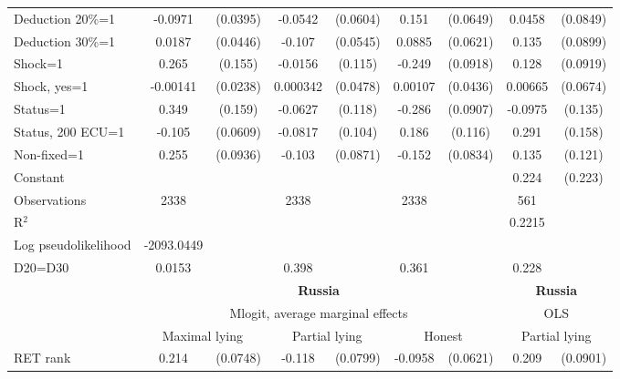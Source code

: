 \begin{tabular}{l|cccccc|cc}
Deduction 20\%=1&  -0.0971\sym{**} & (0.0395)&  -0.0542         & (0.0604)&    0.151\sym{**} & (0.0649)&   0.0458         & (0.0849)\\
Deduction 30\%=1&   0.0187         & (0.0446)&   -0.107\sym{**} & (0.0545)&   0.0885         & (0.0621)&    0.135         & (0.0899)\\
Shock=1         &    0.265\sym{*}  &  (0.155)&  -0.0156         &  (0.115)&   -0.249\sym{***}& (0.0918)&    0.128         & (0.0919)\\
Shock, yes=1    & -0.00141         & (0.0238)& 0.000342         & (0.0478)&  0.00107         & (0.0436)&  0.00665         & (0.0674)\\
Status=1        &    0.349\sym{**} &  (0.159)&  -0.0627         &  (0.118)&   -0.286\sym{***}& (0.0907)&  -0.0975         &  (0.135)\\
Status, 200 ECU=1&   -0.105\sym{*}  & (0.0609)&  -0.0817         &  (0.104)&    0.186         &  (0.116)&    0.291\sym{*}  &  (0.158)\\
Non-fixed=1     &    0.255\sym{***}& (0.0936)&   -0.103         & (0.0871)&   -0.152\sym{*}  & (0.0834)&    0.135         &  (0.121)\\
Constant        &                  &         &                  &         &                  &         &    0.224         &  (0.223)\\
\hline
Observations    &     2338         &         &     2338         &         &     2338         &         &      561         &         \\
R$^2$      &                  &         &                  &         &                  &         &      0.2215     &   \\ 
Log pseudolikelihood  &  -2093.0449  &         &                  &         &                  &         &           &   \\ 
D20=D30         &   0.0153         &         &    0.398         &         &    0.361         &         &    0.228         &         \\
\hline\hline
&\multicolumn{6}{c|}{\bf Russia}&\multicolumn{2}{c}{\bf Russia}\\ &\multicolumn{6}{c|}{Mlogit, average marginal effects }&\multicolumn{2}{c}{OLS}\\
                &\multicolumn{2}{c}{Maximal lying}&\multicolumn{2}{c}{Partial lying}&\multicolumn{2}{c}{Honest}  &\multicolumn{2}{c}{Partial lying}\\
\hline
RET rank        &    0.214\sym{***}& (0.0748)&   -0.118         & (0.0799)&  -0.0958         & (0.0621)&    0.209\sym{**} & (0.0901)\\

\end{tabular}
